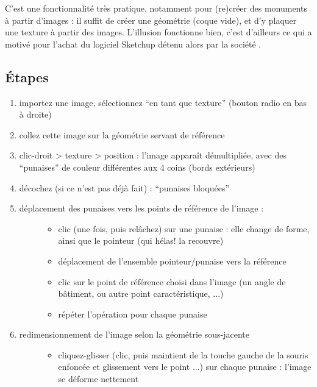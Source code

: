 \documentclass[a4paper,12pt,french]{sphinxmanual}
\begin{document}
C'est une fonctionnalité très pratique, notamment pour (re)créer des monuments à partir d'images : il suffit de créer une géométrie (coque vide), et d'y plaquer une texture à partir des images. L'illusion fonctionne bien, c'est d'ailleurs ce qui a motivé  pour l'achat du logiciel Sketchup détenu alors par la société  .


\subsection{Étapes}
\label{su/import-img-com-texture:etapes}\begin{enumerate}
\item {} 
importez une image, sélectionnez ``en tant que texture'' (bouton radio en bas à droite)

\item {} 
collez cette image sur la géométrie servant de référence

\item {} 
clic-droit \textgreater{} texture \textgreater{} position : l'image apparaît démultipliée, avec des ``punaises'' de couleur différentes aux 4 coins (bords extérieurs)

\item {} 
décochez (si ce n'est pas déjà fait) : ``punaises bloquées''

\item {} \begin{description}
\item[{déplacement des punaises vers les points de référence de l'image :}] \leavevmode\begin{itemize}
\item {} 
clic (une fois, puis relâchez) sur une punaise : elle change de forme, ainsi que le pointeur (qui hélas! la recouvre)

\item {} 
déplacement de l'ensemble pointeur/punaise vers la référence

\item {} 
clic sur le point de référence choisi dans l'image (un angle de bâtiment, ou autre point caractéristique, ...)

\item {} 
répéter l'opération pour chaque punaise

\end{itemize}

\end{description}

\item {} \begin{description}
\item[{redimensionnement de l'image selon la géométrie sous-jacente}] \leavevmode\begin{itemize}
\item {} 
cliquez-glisser (clic, puis maintient de la touche gauche de la souris enfoncée et glissement vers le point ...) sur chaque punaise : l'image se déforme nettement


\end{itemize}
\end{description}
\end{enumerate}
\end{document}
